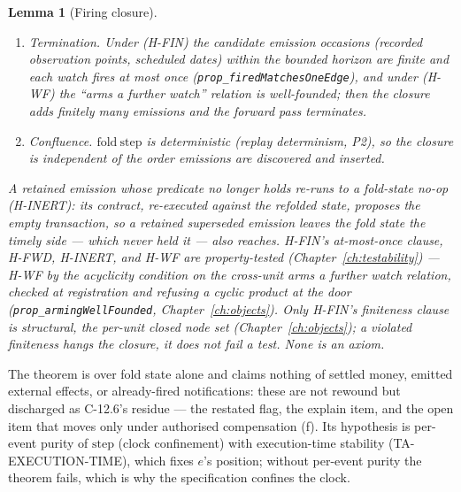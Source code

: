 \documentclass[11pt,a4paper]{article}
\newtheorem{lemma}[definition]{Lemma}
\begin{document}
\begin{lemma}[Firing closure]
\begin{enumerate}
\item \emph{Termination.} Under \textup{(H-FIN)} the candidate emission occasions (recorded
  observation points, scheduled dates) within the bounded horizon are finite and each watch fires
  at most once (\texttt{prop\_firedMatchesOneEdge}), and under \textup{(H-WF)} the
  ``arms a further watch'' relation is well-founded; then the closure adds finitely many emissions
  and the forward pass terminates.
\item \emph{Confluence.} $\mathrm{fold\ step}$ is deterministic (replay determinism, P2), so the
  closure is independent of the order emissions are discovered and inserted.
\end{enumerate}
A retained emission whose predicate no longer holds re-runs to a fold-state no-op
\textup{(H-INERT)}: its contract, re-executed against the refolded state, proposes the empty
transaction, so a retained superseded emission leaves the fold state the timely side --- which
never held it --- also reaches. H-FIN's at-most-once clause, H-FWD, H-INERT, and H-WF are
property-tested (Chapter~\ref{ch:testability}) --- H-WF by the acyclicity condition on the
cross-unit \emph{arms a further watch} relation, checked at registration and refusing a cyclic
product at the door (\texttt{prop\_armingWellFounded}, Chapter~\ref{ch:objects}). Only H-FIN's
finiteness clause is structural, the per-unit closed node set (Chapter~\ref{ch:objects}); a
violated finiteness hangs the closure, it does not fail a test. None is an axiom.
\end{lemma}

The theorem is over fold state alone and claims nothing of settled money, emitted external
effects, or already-fired notifications: these are not rewound but discharged as C-12.6's
residue --- the restated flag, the explain item, and the open item that moves only under
authorised compensation (f). Its hypothesis is per-event purity of $\mathrm{step}$ (clock
confinement) with execution-time stability (TA-EXECUTION-TIME), which fixes $e$'s position;
without per-event purity the theorem fails, which is why the specification confines the clock.
\end{document}
